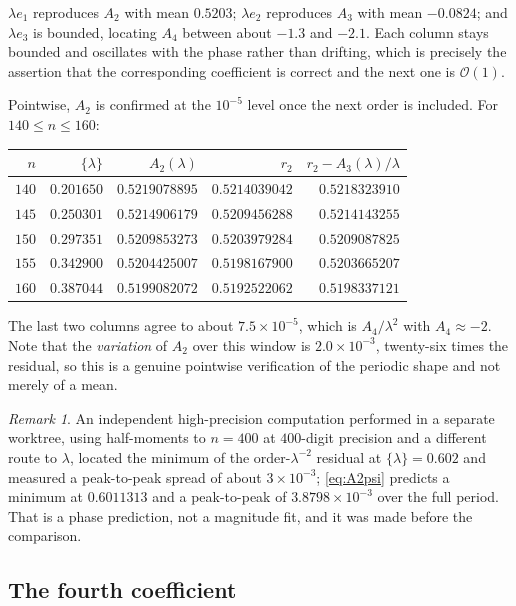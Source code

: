 \documentclass[11pt,oneside]{article}
\theoremstyle{definition}
\theoremstyle{remark}
\newtheorem{remark}[theorem]{Remark}
\newcommand{\bigO}{\mathcal O}
\begin{document}
$\lambda e_1$ reproduces $A_2$ with mean $0.5203$; $\lambda e_2$ reproduces
$A_3$ with mean $-0.0824$; and $\lambda e_3$ is bounded, locating $A_4$ between
about $-1.3$ and $-2.1$.  Each column stays bounded and oscillates with the
phase rather than drifting, which is precisely the assertion that the
corresponding coefficient is correct and the next one is $\bigO(1)$.

Pointwise, $A_2$ is confirmed at the $10^{-5}$ level once the next order is
included.  For $140\le n\le160$:

\begin{center}\small
\begin{tabular}{@{}rrrrr@{}}
\toprule
$n$ & $\{\lambda\}$ & $A_2(\lambda)$ & $r_2$ & $r_2-A_3(\lambda)/\lambda$\\
\midrule
$140$ & $0.201650$ & $0.5219078895$ & $0.5214039042$ & $0.5218323910$\\
$145$ & $0.250301$ & $0.5214906179$ & $0.5209456288$ & $0.5214143255$\\
$150$ & $0.297351$ & $0.5209853273$ & $0.5203979284$ & $0.5209087825$\\
$155$ & $0.342900$ & $0.5204425007$ & $0.5198167900$ & $0.5203665207$\\
$160$ & $0.387044$ & $0.5199082072$ & $0.5192522062$ & $0.5198337121$\\
\bottomrule
\end{tabular}
\end{center}

The last two columns agree to about $7.5\times10^{-5}$, which is
$A_4/\lambda^2$ with $A_4\approx-2$.  Note that the \emph{variation} of $A_2$
over this window is $2.0\times10^{-3}$, twenty-six times the residual, so this
is a genuine pointwise verification of the periodic shape and not merely of a
mean.

\begin{remark}
An independent high-precision computation performed in a separate worktree,
using half-moments to $n=400$ at $400$-digit precision and a different route to
$\lambda$, located the minimum of the order-$\lambda^{-2}$ residual at
$\{\lambda\}=0.602$ and measured a peak-to-peak spread of about
$3\times10^{-3}$; \cref{eq:A2psi} predicts a minimum at $0.6011313$ and a
peak-to-peak of $3.8798\times10^{-3}$ over the full period.  That is a phase
prediction, not a magnitude fit, and it was made before the comparison.
\end{remark}

\subsection{The fourth coefficient}
\end{document}
